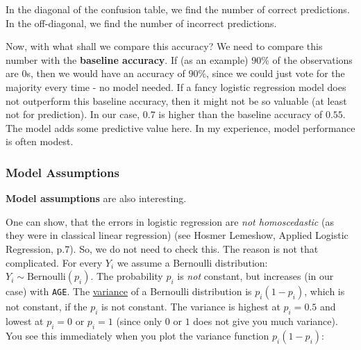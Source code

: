 \documentclass[
]{book}
\begin{document}
In the diagonal of the confusion table, we find the number of correct predictions.
In the off-diagonal, we find the number of incorrect predictions.

Now, with what shall we compare this accuracy?
We need to compare this number with the \textbf{baseline accuracy}.
If (as an example) \(90\%\) of the observations are \(0\)s, then we would have an accuracy of \(90\%\),
since we could just vote for the majority every time - no model needed.
If a fancy logistic regression model does not outperform this baseline accuracy,
then it might not be so valuable (at least not for prediction).
In our case, \(0.7\) is higher than the baseline accuracy of \(0.55\).
The model adds some predictive value here. In my experience,
model performance is often modest.

\subsubsection{Model Assumptions}\label{model_assumptions}

\textbf{Model assumptions} are also interesting.

One can show, that the errors in logistic regression are \emph{not homoscedastic}
(as they were in classical linear regression)
(see Hosmer Lemeshow, Applied Logistic Regression, p.7).
So, we do not need to check this. The reason is not that complicated.
For every \(Y_i\) we assume a Bernoulli distribution: \(Y_i \sim \text{Bernoulli}(p_i)\).
The probability \(p_i\) is \emph{not} constant, but increases (in our case) with \texttt{AGE}.
The \href{https://en.wikipedia.org/wiki/Bernoulli_distribution\#Variance}{variance}
of a Bernoulli distribution is \(p_i(1-p_i)\), which is not constant,
if the \(p_i\) is not constant. The variance is highest at \(p_i = 0.5\) and
lowest at \(p_i = 0\) or \(p_i = 1\) (since only \(0\) or \(1\) does not give you much variance).
You see this immediately when you plot the
variance function \(p_i(1-p_i)\):
\end{document}
